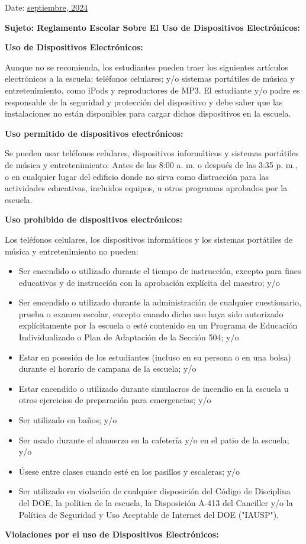 \documentclass[12pt,letterpaper]{article}
\begin{document}
\vspace*{0.5in}
Date: \href{https://www.ps192.org/apps/bbmessages/show_bbm.jsp?REC_ID=139439}{septiembre, 2024} 

\textbf{Sujeto: Reglamento Escolar Sobre El Uso de Dispositivos Electrónicos:}

\textbf{Uso de Dispositivos Electrónicos:}

Aunque no se recomienda, los estudiantes pueden traer los siguientes artículos electrónicos a 
la escuela: teléfonos celulares; y/o sistemas portátiles de música y entretenimiento, como 
iPods y reproductores de MP3. El estudiante y/o padre es responsable de la seguridad y 
protección del dispositivo y debe saber que las instalaciones no están disponibles para cargar
dichos dispositivos en la escuela.

\textbf{Uso permitido de dispositivos electrónicos:}

Se pueden usar teléfonos celulares, dispositivos informáticos y sistemas portátiles de música y entretenimiento: Antes de las 8:00 a. m. o después de las 3:35 p. m., o en cualquier lugar
del edificio donde no sirva como distracción para las actividades educativas, incluidos 
equipos, u otros programas aprobados por la escuela.

\textbf{Uso prohibido de dispositivos electrónicos:}

Los teléfonos celulares, los dispositivos informáticos y los sistemas portátiles de música y entretenimiento no pueden:
\begin{itemize}
\item Ser encendido o utilizado durante el tiempo de instrucción, excepto para fines educativos y de instrucción con la aprobación explícita del maestro; y/o 
\item Ser encendido o utilizado durante la administración de cualquier cuestionario, prueba o examen escolar, excepto cuando dicho uso haya sido autorizado explícitamente por la escuela o esté contenido en un Programa de Educación Individualizado o Plan de Adaptación de la Sección 504; y/o
\item Estar en posesión de los estudiantes (incluso en su persona o en una bolsa) durante el horario de campana de la escuela; y/o 
\item Estar encendido o utilizado durante simulacros de incendio en la escuela u otros ejercicios de preparación para emergencias; y/o
\item Ser utilizado en baños; y/o
\item Ser usado durante el almuerzo en la cafetería y/o en el patio de la escuela; y/o
\item Úsese entre clases cuando esté en los pasillos y escaleras; y/o
\pagebreak
\vspace*{2cm} 
\item Ser utilizado en violación de cualquier disposición del Código de Disciplina del DOE, la política de la escuela, la Disposición A-413 del Canciller y/o la Política de Seguridad y Uso Aceptable de Internet del DOE ("IAUSP").
\end{itemize}
\textbf{Violaciones por el uso de Dispositivos Electrónicos:}
\end{document}
